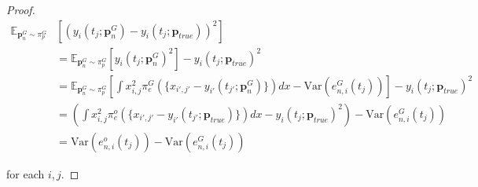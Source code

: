 \documentclass[10pt,a4paper]{amsart}
\begin{document}
\begin{proof}
\begin{align*}
\mathbb{E}_{\mathbf{p}_{n}^{G} \sim \pi_{p}^{G}}&[(y_{i}(t_{j};\mathbf{p}_{n}^{G})-y_{i}(t_{j};\mathbf{p}_{true}))^{2}]\\
&= \mathbb{E}_{\mathbf{p}_{n}^{G} \sim \pi_{p}^{G}}[y_{i}(t_{j};\mathbf{p}_{n}^{G})^{2}]-y_{i}(t_{j};\mathbf{p}_{true})^{2} \\
&= \mathbb{E}_{\mathbf{p}_{n}^{G} \sim \pi_{p}^{G}}[\int x_{i,j}^{2}\pi_{e}^{G}(\{x_{i',j'}-y_{i'}(t_{j'};\mathbf{p}_{n}^{G})\})dx - \text{Var}(e_{n,i}^{G}(t_{j}))]-y_{i}(t_{j};\mathbf{p}_{true})^{2} \\ 
&= (\int x_{i,j}^{2}\pi_{e}^{o}(\{x_{i',j'}-y_{i'}(t_{j'};\mathbf{p}_{true})\})dx - y_{i}(t_{j};\mathbf{p}_{true})^{2}) - \text{Var}(e_{n,i}^{G}(t_{j})) \\ 
&= \text{Var}(e_{n,i}^{o}(t_{j})) - \text{Var}(e_{n,i}^{G}(t_{j}))
\end{align*}

for each $i,j$.
\end{proof}
\end{document}

